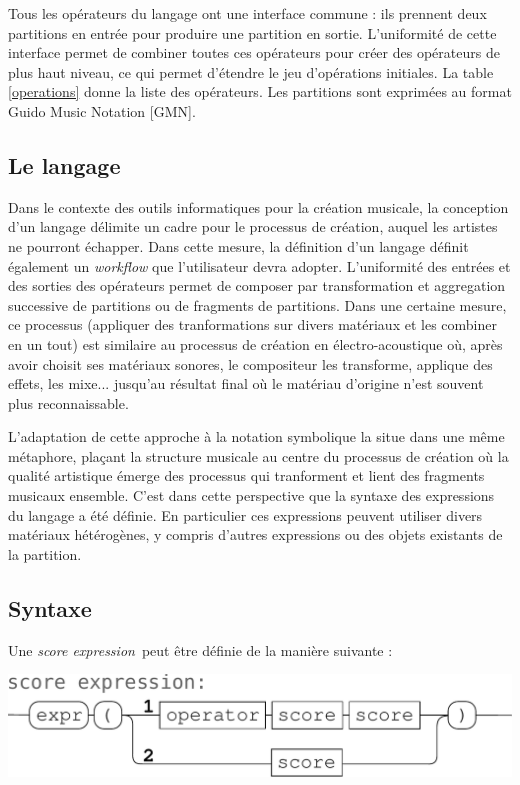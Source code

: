 \documentclass{article}
\newcommand{\sExpr}{\emph{score expression}}
\begin{document}
Tous les opérateurs du langage ont une interface commune : ils prennent deux partitions en entrée pour produire une partition en sortie. L'uniformité de cette interface permet de combiner toutes ces opérateurs pour créer des opérateurs de plus haut niveau, ce qui permet d'étendre le jeu d'opérations initiales. La table \ref{operations} donne la liste des opérateurs.
Les partitions sont exprimées au format Guido Music Notation [GMN]\cite{hoos98}. 


\subsection{Le langage}

Dans le contexte des outils informatiques pour la création musicale, la conception d'un langage délimite un cadre pour le processus de création, auquel les artistes ne pourront échapper. Dans cette mesure, la définition d'un langage définit également un \textit{workflow} que l'utilisateur devra adopter. 
L'uniformité des entrées et des sorties des opérateurs permet de composer par transformation et aggregation successive de partitions ou de fragments de partitions. Dans une certaine mesure, ce processus (appliquer des tranformations sur divers matériaux et les combiner en un tout) est similaire au processus de création en électro-acoustique où, après avoir choisit ses matériaux sonores, le compositeur les transforme, applique des effets, les mixe... jusqu'au résultat final où le matériau d'origine n'est souvent plus reconnaissable.

L'adaptation de cette approche à la notation symbolique la situe dans une même métaphore, plaçant la structure musicale au centre du processus de création où la qualité artistique émerge des processus qui tranforment et lient des fragments musicaux ensemble.
C'est dans cette perspective que la syntaxe des expressions du langage a été définie. En particulier ces expressions peuvent utiliser divers matériaux hétérogènes, y compris d'autres expressions ou des objets existants de la partition.


\subsection{Syntaxe}
Une \sExpr\ peut être définie de la manière suivante :
\begin{center}
\includegraphics[width=0.9\columnwidth]{imgs/syntax1}
\end{center}
\end{document}
